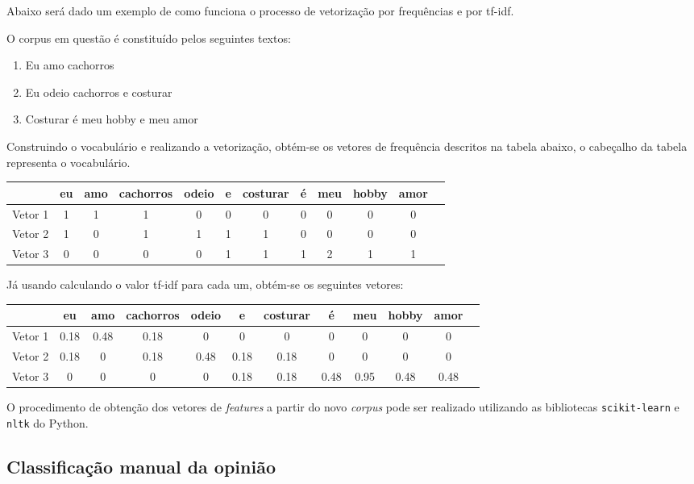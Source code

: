 Abaixo será dado um exemplo de como funciona o processo de vetorização por frequências e por
tf-idf.

O corpus em questão é constituído pelos seguintes textos:

\begin{enumerate}
	\item Eu amo cachorros
	\item Eu odeio cachorros e costurar
	\item Costurar é meu hobby e meu amor
\end{enumerate}

Construindo o vocabulário e realizando a vetorização, obtém-se os vetores de frequência descritos na tabela abaixo, o
cabeçalho da tabela representa o vocabulário.

\begin{tabular}{| c | c | c | c | c | c | c | c | c | c | c | c |}
\hline
& eu & amo & cachorros & odeio & e & costurar & é & meu & hobby & amor \\ \hline
Vetor 1 & 1 & 1 & 1 & 0 & 0 & 0 & 0 & 0 & 0  & 0  \\ \hline
Vetor 2 & 1 & 0 & 1 & 1 & 1 & 1 & 0 & 0 & 0 & 0  \\ \hline
Vetor 3 & 0 & 0 & 0 & 0 & 1 & 1 & 1 & 2 & 1 & 1  \\ \hline
\end{tabular}

Já usando calculando o valor tf-idf para cada um, obtém-se os seguintes vetores:

\begin{tabular}{| c | c | c | c | c | c | c | c | c | c | c | c |}
\hline
& eu & amo & cachorros & odeio & e & costurar & é & meu & hobby & amor \\ \hline
Vetor 1 & 0.18 & 0.48 & 0.18 & 0 & 0 & 0 & 0 & 0 & 0  & 0  \\ \hline
Vetor 2 & 0.18 & 0 & 0.18 & 0.48 & 0.18 & 0.18 & 0 & 0 & 0 & 0  \\ \hline
Vetor 3 & 0 & 0 & 0 & 0 & 0.18 & 0.18 & 0.48 & 0.95 & 0.48 & 0.48  \\ \hline
\end{tabular}

O procedimento de obtenção dos vetores de \textit{features} a partir do novo \textit{corpus} pode
ser realizado utilizando as bibliotecas \texttt{scikit-learn} e \texttt{nltk} do Python.

\subsection{Classificação manual da opinião}

